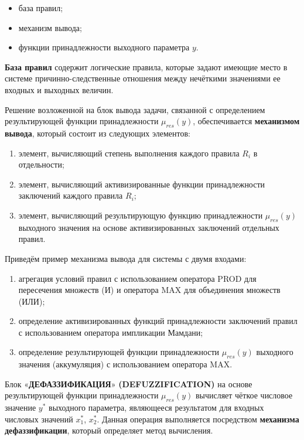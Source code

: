 \begin{itemize}[label*=---]
	\item база правил;
	\item механизм вывода;
	\item функции принадлежности выходного параметра $y$.
\end{itemize}

\textbf{База правил} содержит логические правила, которые задают имеющие место в системе причинно-следственные отношения между нечёткими значениями ее входных и выходных величин.~\cite{book}

Решение возложенной на блок вывода задачи, связанной с определением результирующей функции принадлежности $\mu_{res}(y)$, обеспечивается
\textbf{механизмом вывода}, который состоит из следующих элементов:
\begin{enumerate}[label*=\textbf{IM\arabic*:}]
	\item элемент, вычисляющий степень выполнения каждого правила $R_i$
	в отдельности;
	\item элемент, вычисляющий активизированные функции принадлежности заключений каждого правила $R_i$;
	\item элемент, вычисляющий результирующую функцию принадлежности $\mu_{res}(y)$ выходного значения на основе активизированных заключений отдельных правил.~\cite{book}
\end{enumerate}

Приведём пример механизма вывода для системы с двумя входами:
\begin{enumerate}[label*=\textbf{IM\arabic*:}]
	\item агрегация условий правил с использованием оператора PROD
	для пересечения множеств (И) и оператора MAX для объединения множеств (ИЛИ);
	\item определение активизированных функций принадлежности заключений правил с использованием оператора импликации Мамдани;
	\item определение результирующей функции принадлежности $\mu_{res}(y)$
	выходного значения (аккумуляция) с использованием оператора MAX.~\cite{book}
\end{enumerate}

Блок «\textbf{ДЕФАЗЗИФИКАЦИЯ}» \textbf{(DEFUZZIFICATION)} на основе
результирующей функции принадлежности $\mu_{res}(y)$ вычисляет чёткое
числовое значение $y^*$ выходного параметра, являющееся результатом
для входных числовых значений $x^*_1$, $x^*_2$. Данная операция выполняется
посредством \textbf{механизма дефаззификации}, который определяет метод
вычисления.~\cite{book}

